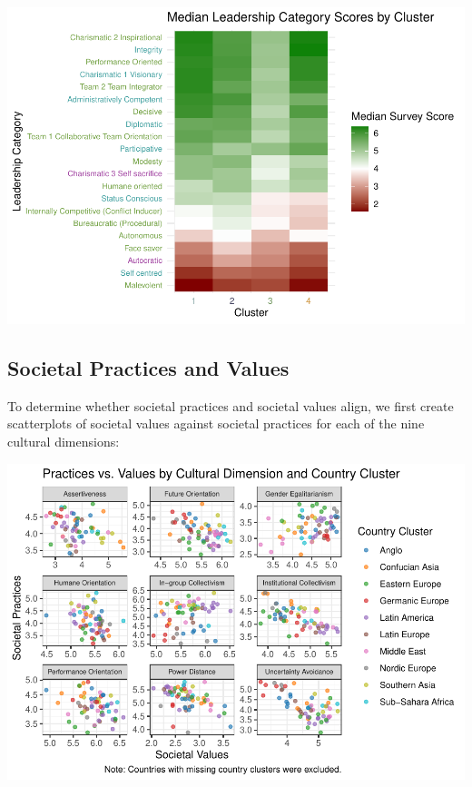 \documentclass[
]{article}
\begin{document}
\begin{center}\includegraphics[width=0.85\linewidth]{final_report_files/figure-latex/unnamed-chunk-7-1} \end{center}

\hypertarget{societal-practices-and-values}{%
\subsection{Societal Practices and
Values}\label{societal-practices-and-values}}

To determine whether societal practices and societal values align, we
first create scatterplots of societal values against societal practices
for each of the nine cultural dimensions:

\begin{center}\includegraphics[width=0.85\linewidth]{final_report_files/figure-latex/SPV Plots-1} \end{center}
\end{document}
